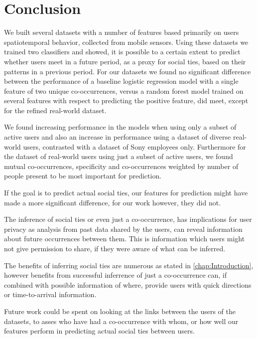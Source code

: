 \chapter{Conclusion}
\label{chap:conclusion}
We built several datasets with a number of features based primarily on users spatiotemporal behavior, collected from mobile sensors. Using these datasets we trained two classifiers and showed, it is possible to a certain extent to predict whether users meet in a future period, as a proxy for social ties, based on their patterns in a previous period. For our datasets we found no significant difference between the performance of a baseline logistic regression model with a single feature of two unique co-occurrences, versus a random forest model trained on several features with respect to predicting the positive feature, did meet, except for the refined real-world dataset.

We found increasing performance in the models when using only a subset of active users and also an increase in performance using a dataset of diverse real-world users, contrasted with a dataset of Sony employees only. Furthermore for the dataset of real-world users using just a subset of active users, we found mutual co-occurrences, specificity and co-occurrences weighted by number of people present to be most important for prediction.

If the goal is to predict actual social ties, our features for prediction might have made a more significant difference, for our work however, they did not.

The inference of social ties or even just a co-occurrence, has implications for user privacy as analysis from past data shared by the users, can reveal information about future occurrences between them. This is information which users might not give permission to share, if they were aware of what can be inferred.

The benefits of inferring social ties are numerous as stated in \autoref{chap:Introduction}, however benefits from successful inferrence of just a co-occurrence can, if combined with possible information of where, provide users with quick directions or time-to-arrival information.

Future work could be spent on looking at the links between the users of the datasets, to asses who have had a co-occurrence with whom, or how well our features perform in predicting actual social ties between users.